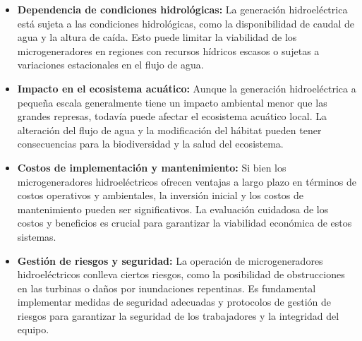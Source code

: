 \documentclass[11pt]{article}
\begin{document}
            \begin{itemize}
                \item \textbf{Dependencia de condiciones hidrológicas:} La generación hidroeléctrica está sujeta a las
                condiciones hidrológicas, como la disponibilidad de caudal de agua y la altura de caída.
                Esto puede limitar la viabilidad de los microgeneradores en regiones con recursos hídricos
                escasos o sujetas a variaciones estacionales en el flujo de agua.
                
                \item \textbf{Impacto en el ecosistema acuático:} Aunque la generación hidroeléctrica a pequeña escala
                generalmente tiene un impacto ambiental menor que las grandes represas, todavía puede
                afectar el ecosistema acuático local. La alteración del flujo de agua y la modificación del
                hábitat pueden tener consecuencias para la biodiversidad y la salud del ecosistema.
                
                \item \textbf{Costos de implementación y mantenimiento:} Si bien los microgeneradores hidroeléctricos
                ofrecen ventajas a largo plazo en términos de costos operativos y ambientales, la inversión
                inicial y los costos de mantenimiento pueden ser significativos. La evaluación cuidadosa de
                los costos y beneficios es crucial para garantizar la viabilidad económica de estos sistemas.
                
                \item \textbf{Gestión de riesgos y seguridad:} La operación de microgeneradores hidroeléctricos conlleva
                ciertos riesgos, como la posibilidad de obstrucciones en las turbinas o daños por
                inundaciones repentinas. Es fundamental implementar medidas de seguridad adecuadas y
                protocolos de gestión de riesgos para garantizar la seguridad de los trabajadores y la
                integridad del equipo.
            \end{itemize}

\end{document}
